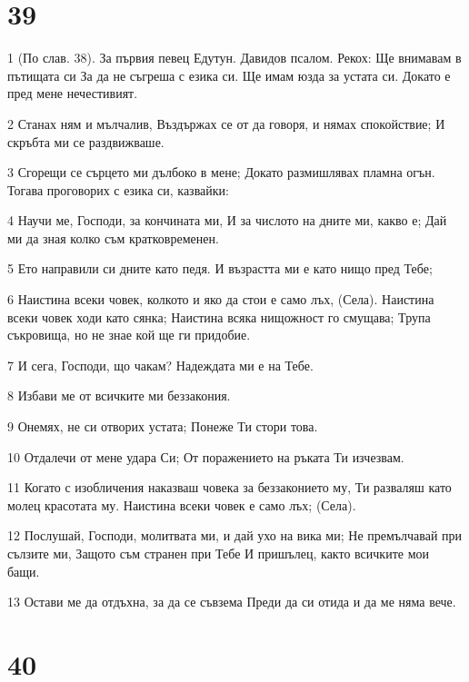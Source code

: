 \chapter{39}

\par 1 (По слав. 38). За първия певец Едутун. Давидов псалом. Рекох: Ще внимавам в пътищата си За да не съгреша с езика си. Ще имам юзда за устата си. Докато е пред мене нечестивият.
\par 2 Станах ням и мълчалив, Въздържах се от да говоря, и нямах спокойствие; И скръбта ми се раздвижваше.
\par 3 Сгорещи се сърцето ми дълбоко в мене; Докато размишлявах пламна огън. Тогава проговорих с езика си, казвайки:
\par 4 Научи ме, Господи, за кончината ми, И за числото на дните ми, какво е; Дай ми да зная колко съм кратковременен.
\par 5 Ето направили си дните като педя. И възрастта ми е като нищо пред Тебе;
\par 6 Наистина всеки човек, колкото и яко да стои е само лъх, (Села). Наистина всеки човек ходи като сянка; Наистина всяка нищожност го смущава; Трупа съкровища, но не знае кой ще ги придобие.
\par 7 И сега, Господи, що чакам? Надеждата ми е на Тебе.
\par 8 Избави ме от всичките ми беззакония.
\par 9 Онемях, не си отворих устата; Понеже Ти стори това.
\par 10 Отдалечи от мене удара Си; От поражението на ръката Ти изчезвам.
\par 11 Когато с изобличения наказваш човека за беззаконието му, Ти разваляш като молец красотата му. Наистина всеки човек е само лъх; (Села).
\par 12 Послушай, Господи, молитвата ми, и дай ухо на вика ми; Не премълчавай при сълзите ми, Защото съм странен при Тебе И пришълец, както всичките мои бащи.
\par 13 Остави ме да отдъхна, за да се съвзема Преди да си отида и да ме няма вече.

\chapter{40}

